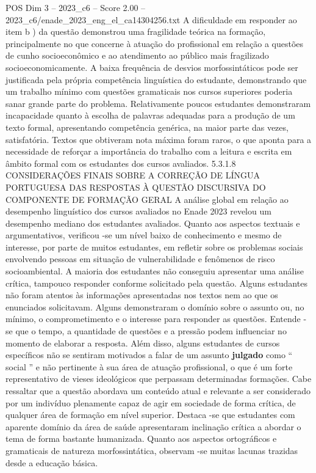 \begin{textsample}{POS Dim 3 – 2023\_c6 – Score 2.00 – 2023\_c6/enade\_2023\_eng\_el\_ca14304256.txt}
A dificuldade em responder ao item b ) da questão demonstrou uma fragilidade teórica na formação, principalmente no que concerne à atuação do profissional em relação a questões de cunho socioeconômico e ao atendimento ao público mais fragilizado socioeconomicamente.
A baixa frequência de desvios morfossintáticos pode ser justificada pela própria competência linguística do estudante, demonstrando que um trabalho mínimo com questões gramaticais nos cursos superiores poderia sanar grande parte do problema.
Relativamente poucos estudantes demonstraram incapacidade quanto à escolha de palavras adequadas para a produção de um texto formal, apresentando competência genérica, na maior parte das vezes, satisfatória.
Textos que obtiveram nota máxima foram raros, o que aponta para a necessidade de reforçar a importância do trabalho com a leitura e escrita em âmbito formal com os estudantes dos cursos avaliados. 5.3.1.8 CONSIDERAÇÕES FINAIS SOBRE A CORREÇÃO DE LÍNGUA PORTUGUESA DAS RESPOSTAS À QUESTÃO DISCURSIVA DO COMPONENTE DE FORMAÇÃO GERAL A análise global em relação ao desempenho linguístico dos cursos avaliados no Enade 2023 revelou um desempenho mediano dos estudantes avaliados.
Quanto aos aspectos textuais e argumentativos, verificou -se um nível baixo de conhecimento e mesmo de interesse, por parte de muitos estudantes, em refletir sobre os problemas sociais envolvendo pessoas em situação de vulnerabilidade e fenômenos de risco socioambiental.
A maioria dos estudantes não conseguiu apresentar uma análise crítica, tampouco responder conforme solicitado pela questão.
Alguns estudantes não foram atentos às informações apresentadas nos textos nem ao que os enunciados solicitavam.
Alguns demonstraram o domínio sobre o assunto ou, no mínimo, o comprometimento e o interesse para responder as questões.
Entende -se que o tempo, a quantidade de questões e a pressão podem influenciar no momento de elaborar a resposta.
Além disso, alguns estudantes de cursos específicos não se sentiram motivados a falar de um assunto \textbf{julgado} como “ social ” e não pertinente à sua área de atuação profissional, o que é um forte representativo de vieses ideológicos que perpassam determinadas formações.
Cabe ressaltar que a questão abordava um conteúdo atual e relevante a ser considerado por um indivíduo plenamente capaz de agir em sociedade de forma crítica, de qualquer área de formação em nível superior.
Destaca -se que estudantes com aparente domínio da área de saúde apresentaram inclinação crítica a abordar o tema de forma bastante humanizada.
Quanto aos aspectos ortográficos e gramaticais de natureza morfossintática, observam -se muitas lacunas trazidas desde a educação básica.

\end{textsample}
